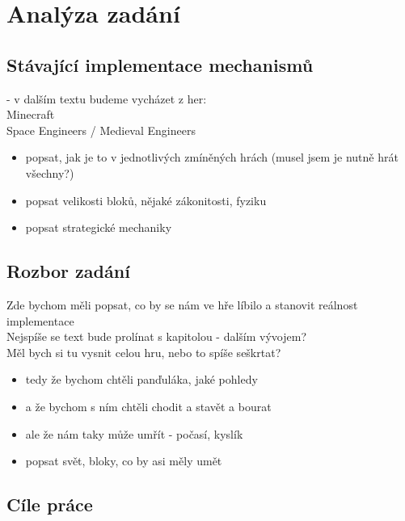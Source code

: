 
\chapter{Analýza zadání}

\section{Stávající implementace mechanismů}
- v dalším textu budeme vycházet z her: \\

Minecraft \\
Space Engineers / Medieval Engineers \\

\begin{itemize}
	\item popsat, jak je to v jednotlivých zmíněných hrách (musel jsem je nutně hrát všechny?)
	\item popsat velikosti bloků, nějaké zákonitosti, fyziku
	\item popsat strategické mechaniky
\end{itemize}

\section{Rozbor zadání}

Zde bychom měli popsat, co by se nám ve hře líbilo a stanovit reálnost implementace
\\

Nejspíše se text bude prolínat s kapitolou - dalším vývojem?\\
Měl bych si tu vysnit celou hru, nebo to spíše seškrtat?


\begin{itemize}
	\item tedy že bychom chtěli panďuláka, jaké pohledy
	\item a že bychom s ním chtěli chodit a stavět a bourat
	\item ale že nám taky může umřít - počasí, kyslík
	\item popsat svět, bloky, co by asi měly umět

\end{itemize}


\section{Cíle práce}